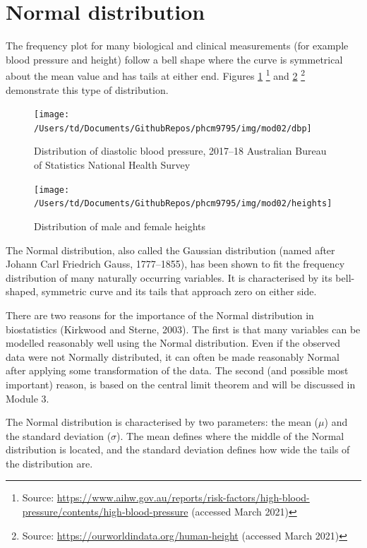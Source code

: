 \documentclass[
]{memoir}
\begin{document}
\hypertarget{normal-distribution}{%
\section{Normal distribution}\label{normal-distribution}}

The frequency plot for many biological and clinical measurements (for example blood pressure and height) follow a bell shape where the curve is symmetrical about the mean value and has tails at either end. Figures \ref{fig:fig-2-1} \footnote{Source: \url{https://www.aihw.gov.au/reports/risk-factors/high-blood-pressure/contents/high-blood-pressure} (accessed March 2021)} and \ref{fig:fig-2-2} \footnote{Source: \url{https://ourworldindata.org/human-height} (accessed March 2021)} demonstrate this type of distribution.

\begin{figure}
\texttt{[image: /Users/td/Documents/GithubRepos/phcm9795/img/mod02/dbp]} \caption{Distribution of diastolic blood pressure, 2017–18 Australian Bureau of Statistics National Health Survey}\label{fig:fig-2-1}
\end{figure}

\begin{figure}
\texttt{[image: /Users/td/Documents/GithubRepos/phcm9795/img/mod02/heights]} \caption{Distribution of male and female heights}\label{fig:fig-2-2}
\end{figure}

The Normal distribution, also called the Gaussian distribution (named after Johann Carl Friedrich Gauss, 1777--1855), has been shown to fit the frequency distribution of many naturally occurring variables. It is characterised by its bell-shaped, symmetric curve and its tails that approach zero on either side.

There are two reasons for the importance of the Normal distribution in biostatistics (Kirkwood and Sterne, 2003). The first is that many variables can be modelled reasonably well using the Normal distribution. Even if the observed data were not Normally distributed, it can often be made reasonably Normal after applying some transformation of the data. The second (and possible most important) reason, is based on the central limit theorem and will be discussed in Module 3.

The Normal distribution is characterised by two parameters: the mean (\(\mu\)) and the standard deviation (\(\sigma\)). The mean defines where the middle of the Normal distribution is located, and the standard deviation defines how wide the tails of the distribution are.
\end{document}
